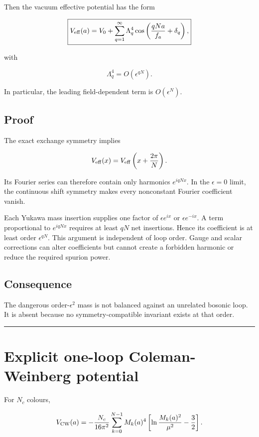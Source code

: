 \documentclass[11pt,a4paper]{article}
\begin{document}
Then the vacuum effective potential has the form

\[
\boxed{
V_{\rm eff}(a)
=
V_0
+
\sum_{q=1}^{\infty}
\Lambda_q^4
\cos\left(
\frac{qNa}{f_a}+\delta_q
\right),
}
\]

with

\[
\boxed{
\Lambda_q^4=O\left(\epsilon^{qN}\right).
}
\]

In particular, the leading field-dependent term is \(O(\epsilon^N)\).

\subsection{Proof}\label{proof}

The exact exchange symmetry implies

\[
V_{\rm eff}(x)=V_{\rm eff}\left(x+\frac{2\pi}{N}\right).
\]

Its Fourier series can therefore contain only harmonics \(e^{iqNx}\). In
the \(\epsilon=0\) limit, the continuous shift symmetry makes every
nonconstant Fourier coefficient vanish.

Each Yukawa mass insertion supplies one factor of \(\epsilon e^{ix}\) or
\(\epsilon e^{-ix}\). A term proportional to \(e^{iqN x}\) requires at
least \(qN\) net insertions. Hence its coefficient is at least order
\(\epsilon^{qN}\). This argument is independent of loop order. Gauge and
scalar corrections can alter coefficients but cannot create a forbidden
harmonic or reduce the required spurion power.

\subsection{Consequence}\label{consequence}

The dangerous order-\(\epsilon^2\) mass is not balanced against an
unrelated bosonic loop. It is absent because no symmetry-compatible
invariant exists at that order.

\begin{center}\rule{0.5\linewidth}{0.5pt}\end{center}

\section{Explicit one-loop Coleman-Weinberg
potential}\label{explicit-one-loop-coleman-weinberg-potential}

For \(N_c\) colours,

\[
V_{\rm CW}(a)
=-\frac{N_c}{16\pi^2}
\sum_{k=0}^{N-1}
M_k(a)^4
\left[
\ln\frac{M_k(a)^2}{\mu^2}-\frac32
\right].
\]
\end{document}
